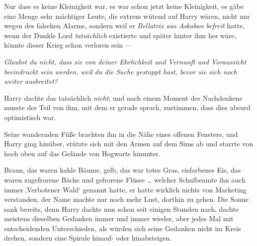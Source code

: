 Nur dass es keine Kleinigkeit war, es war schon jetzt keine Kleinigkeit, es gäbe eine Menge sehr mächtiger Leute, die extrem wütend auf Harry wären, nicht nur wegen des falschen Alarms, sondern weil er \emph{Bellatrix aus Askaban befreit} hatte, wenn der Dunkle Lord \emph{tatsächlich} existierte und später hinter ihm her wäre, könnte dieser Krieg schon verloren sein —

\emph{Glaubst du nicht, dass sie von deiner Ehrlichkeit und Vernunft und Voraussicht beeindruckt sein werden, weil du die Sache gestoppt hast, bevor sie sich noch weiter ausbreitet?}

Harry dachte das tatsächlich \emph{nicht}; und nach einem Moment des Nachdenkens musste der Teil von ihm, mit dem er gerade sprach, zustimmen, dass dies absurd optimistisch war.

Seine wandernden Füße brachten ihn in die Nähe eines offenen Fensters, und Harry ging hinüber, stützte sich mit den Armen auf dem Sims ab und starrte von hoch oben auf das Gelände von Hogwarts hinunter.

Braun, das waren kahle Bäume, gelb, das war totes Gras, eisfarbenes Eis, das waren zugefrorene Bäche und gefrorene Flüsse … welcher Schulbeamte ihn auch immer ‚Verbotener Wald‘ genannt hatte, er hatte wirklich nichts von Marketing verstanden, der Name machte nur noch mehr Lust, dorthin zu gehen. Die Sonne sank bereits, denn Harry dachte nun schon seit einigen Stunden nach, dachte meistens dieselben Gedanken immer und immer wieder, aber jedes Mal mit entscheidenden Unterschieden, als würden sich seine Gedanken nicht im Kreis drehen, sondern eine Spirale hinauf- oder hinabsteigen.

